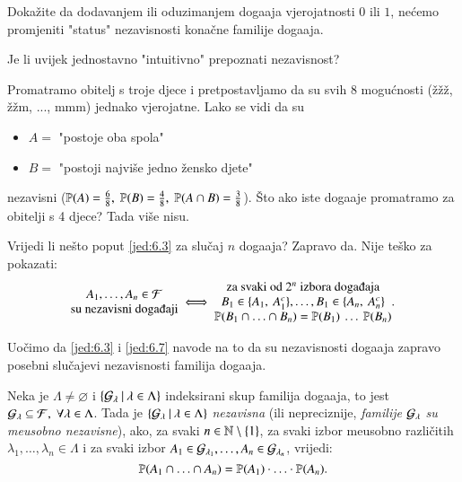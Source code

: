 \begin{zad} \label{zad:6.5}
    Doka\v zite da dodavanjem ili oduzimanjem doga\dj aja vjerojatnosti $0$ ili $1$, ne\' cemo promjeniti "status" nezavisnosti kona\v cne familije doga\dj aja.
\end{zad}

Je li uvijek jednostavno "intuitivno" prepoznati nezavisnost?

\begin{pr}  \label{pr:6.6}
    Promatramo obitelj s troje djece i pretpostavljamo da su svih 8 mogu\' cnosti (\v z\v z\v z, \v z\v zm, ..., mmm) jednako vjerojatne.
    Lako se vidi da su
    \begin{itemize}
        \item[] $A =$ "postoje oba spola"
        \item[] $B = $ "postoji najvi\v se jedno \v zensko djete"
    \end{itemize}
    nezavisni ($\mathbb{P}({A}) = \frac{6}{8}, \; \mathbb{P}({B}) = \frac{4}{8}, \; \mathbb{P}({A \cap B}) = \frac{3}{8}$).
    \v Sto ako iste doga\dj aje promatramo za obitelji s 4 djece? Tada vi\v se nisu.
\end{pr}

Vrijedi li ne\v sto poput \eqref{jed:6.3} za slu\v caj $n$ doga\dj aja?
Zapravo da. Nije te\v sko za pokazati:
\begin{equation}    \label{jed:6.7}
    \begin{matrix}
        A_1, \ldots, A_n \in \famF\\
        \textnormal{su nezavisni doga\dj aji}
    \end{matrix}
    \iff
    \begin{matrix}
        \textnormal{za svaki od $2^n$ izbora doga\dj aja}\\
        B_1 \in \{A_1, \: A_1^c\}, \ldots, B_1 \in \{A_n, \: A_n^c\}\\
        \vjeroj{B_1 \cap \ldots \cap B_n} = \vjeroj{B_1} \: \ldots \: \vjeroj{B_n}
    \end{matrix}
    .
\end{equation}

Uo\v cimo da \eqref{jed:6.3} i \eqref{jed:6.7} navode na to da su nezavisnosti doga\dj aja zapravo posebni slu\v cajevi nezavisnosti familija doga\dj aja.

\begin{defn}    \label{defn:6.8}
    Neka je $\Lambda \neq \varnothing$ i $\{{\mathcal{G}_\lambda} \: | \: {\lambda \in \Lambda}\}$ indeksirani skup familija doga\dj aja, to jest $\mathcal{G}_\lambda \subseteq \mathcal{F}, \; \forall \lambda \in \Lambda$.
    Tada je $\{{\mathcal{G}_\lambda} \: | \: {\lambda \in \Lambda}\}$ \emph{nezavisna} (ili nepreciznije, \emph{familije} $\mathcal{G}_\lambda$ \emph{su me\dj usobno nezavisne}), ako, za svaki $n \in \mathbb{N} \setminus \{1\}$, za svaki izbor me\dj usobno razli\v citih $\lambda_1, \ldots, \lambda_n \in \Lambda$ i za svaki izbor $A_1 \in \mathcal{G}_{\lambda_1}, \ldots, A_n \in \mathcal{G}_{\lambda_n}$, vrijedi:
    \begin{equation*}
        \mathbb{P}({A_1 \cap \ldots \cap A_n}) = \mathbb{P}({A_1}) \cdot \ldots \cdot \mathbb{P}({A_n}).
    \end{equation*}
\end{defn}

